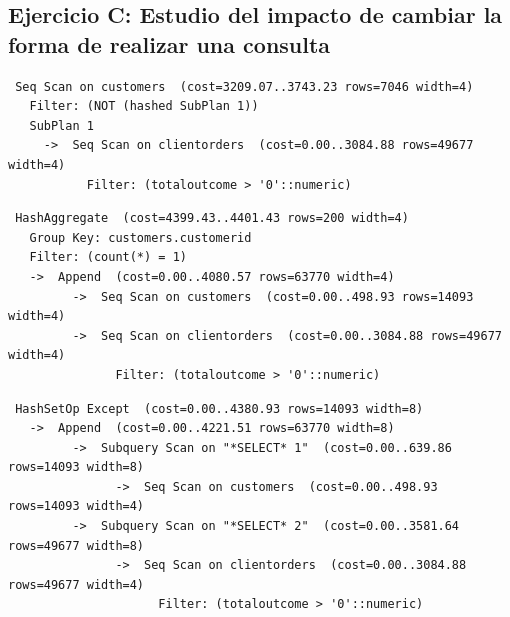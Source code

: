 \documentclass{article}
\begin{document}
\subsection{Ejercicio C: {\small Estudio del impacto de cambiar la forma de realizar una consulta}}
\begin{lstlisting}
 Seq Scan on customers  (cost=3209.07..3743.23 rows=7046 width=4)
   Filter: (NOT (hashed SubPlan 1))
   SubPlan 1
     ->  Seq Scan on clientorders  (cost=0.00..3084.88 rows=49677 width=4)
           Filter: (totaloutcome > '0'::numeric)
\end{lstlisting}
\begin{lstlisting}
 HashAggregate  (cost=4399.43..4401.43 rows=200 width=4)
   Group Key: customers.customerid
   Filter: (count(*) = 1)
   ->  Append  (cost=0.00..4080.57 rows=63770 width=4)
         ->  Seq Scan on customers  (cost=0.00..498.93 rows=14093 width=4)
         ->  Seq Scan on clientorders  (cost=0.00..3084.88 rows=49677 width=4)
               Filter: (totaloutcome > '0'::numeric)
\end{lstlisting}
\begin{lstlisting}
 HashSetOp Except  (cost=0.00..4380.93 rows=14093 width=8)
   ->  Append  (cost=0.00..4221.51 rows=63770 width=8)
         ->  Subquery Scan on "*SELECT* 1"  (cost=0.00..639.86 rows=14093 width=8)
               ->  Seq Scan on customers  (cost=0.00..498.93 rows=14093 width=4)
         ->  Subquery Scan on "*SELECT* 2"  (cost=0.00..3581.64 rows=49677 width=8)
               ->  Seq Scan on clientorders  (cost=0.00..3084.88 rows=49677 width=4)
                     Filter: (totaloutcome > '0'::numeric)
\end{lstlisting}
\end{document}
